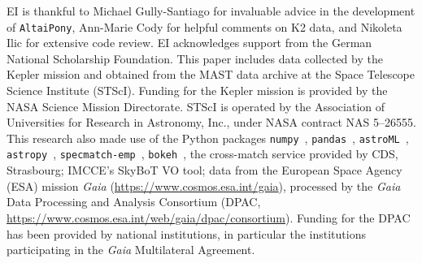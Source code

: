 \documentclass{aa}
\begin{document}
\begin{acknowledgements}
EI is thankful to Michael Gully-Santiago for invaluable advice in the development of \texttt{AltaiPony}, Ann-Marie Cody for helpful comments on K2 data, and Nikoleta Ilic for extensive code review. EI acknowledges support from the German National Scholarship Foundation.
This paper includes data collected by the Kepler mission and obtained from the MAST data archive at the Space Telescope Science Institute (STScI). Funding for the Kepler mission is provided by the NASA Science Mission Directorate. STScI is operated by the Association of Universities for Research in Astronomy, Inc., under NASA contract NAS 5–26555.
This research also made use of the Python packages \texttt{numpy}~\citep{numpy2011}, \texttt{pandas}~\citep{pandas2020software,pandas2010}, \texttt{astroML}~\citep{astroML2012, astroML2014}, \texttt{astropy}~\citep{astropy2013}, \texttt{specmatch-emp}~\citep{yee_specmatch_2017}, \texttt{bokeh}~\citep{bokeh}, the cross-match service provided by CDS, Strasbourg; IMCCE's SkyBoT VO tool; data from the European Space Agency (ESA) mission
{\it Gaia} (\url{https://www.cosmos.esa.int/gaia}), processed by the {\it Gaia}
Data Processing and Analysis Consortium (DPAC,
\url{https://www.cosmos.esa.int/web/gaia/dpac/consortium}). Funding for the DPAC
has been provided by national institutions, in particular the institutions
participating in the {\it Gaia} Multilateral Agreement.
\end{acknowledgements}

\end{document}
